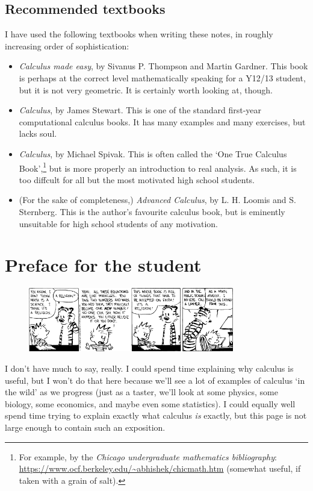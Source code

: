 \documentclass[a4paper]{memoir}
\theoremstyle{definition}
\begin{document}
\section{Recommended textbooks}
I have used the following textbooks when writing these notes, in roughly increasing order of sophistication:
\begin{itemize}
  \item \emph{Calculus made easy}, by Sivanus P. Thompson and Martin Gardner. This book is perhaps at the correct level mathematically speaking
        for a Y12/13 student, but it is not very geometric. It is certainly worth looking at, though.
  \item \emph{Calculus}, by James Stewart. This is one of the standard first-year computational calculus books. It has many examples and many exercises,
        but lacks soul.
  \item \emph{Calculus}, by Michael Spivak. This is often called the `One True Calculus Book',\footnote{For example, by the \emph{Chicago undergraduate
        mathematics bibliography}: \url{https://www.ocf.berkeley.edu/~abhishek/chicmath.htm} (somewhat useful, if taken with a grain of salt).} but
        is more properly an introduction to real analysis. As such, it is too diffcult for all but the most motivated high school students.
  \item (For the sake of completeness,) \emph{Advanced Calculus}, by L. H. Loomis and S. Sternberg. This is the author's favourite calculus
        book, but is eminently unsuitable for high school students of any motivation.
\end{itemize}

\chapter{Preface for the student}
\begin{figure}
  \centering
  \includegraphics[width=0.8\textwidth]{hobbes}
\end{figure}
I don't have much to say, really. I could spend time explaining why calculus is useful, but I won't do that here because we'll see
a lot of examples of calculus `in the wild' as we progress (just as a taster, we'll look at some physics, some biology, some economics,
and maybe even some statistics). I could equally well spend time trying to explain exactly what calculus \emph{is} exactly, but this
page is not large enough to contain such an exposition.
\end{document}
